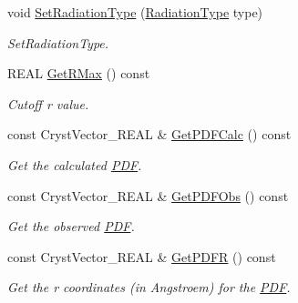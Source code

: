 \begin{DoxyCompactItemize}
\mbox{\label{class_obj_cryst_1_1_p_d_f_a51d1cebecb13d8e60038fca30547c84e}} 
void \mbox{\hyperlink{class_obj_cryst_1_1_p_d_f_a51d1cebecb13d8e60038fca30547c84e}{Set\+Radiation\+Type}} (\mbox{\hyperlink{namespace_obj_cryst_a48fe50a094c607f8897378934d3d73ef}{Radiation\+Type}} type)
\begin{DoxyCompactList}\small\item\em Set\+Radiation\+Type. \end{DoxyCompactList}\item 
\mbox{\label{class_obj_cryst_1_1_p_d_f_a5db609105099fce2d78202bae8f39295}} 
R\+E\+AL \mbox{\hyperlink{class_obj_cryst_1_1_p_d_f_a5db609105099fce2d78202bae8f39295}{Get\+R\+Max}} () const
\begin{DoxyCompactList}\small\item\em Cutoff r value. \end{DoxyCompactList}\item 
\mbox{\label{class_obj_cryst_1_1_p_d_f_a726dbb04cc16b30da30e7e71a6a19551}} 
const Cryst\+Vector\+\_\+\+R\+E\+AL \& \mbox{\hyperlink{class_obj_cryst_1_1_p_d_f_a726dbb04cc16b30da30e7e71a6a19551}{Get\+P\+D\+F\+Calc}} () const
\begin{DoxyCompactList}\small\item\em Get the calculated \mbox{\hyperlink{class_obj_cryst_1_1_p_d_f}{P\+DF}}. \end{DoxyCompactList}\item 
\mbox{\label{class_obj_cryst_1_1_p_d_f_a4681c11b987a33135c306197b230b939}} 
const Cryst\+Vector\+\_\+\+R\+E\+AL \& \mbox{\hyperlink{class_obj_cryst_1_1_p_d_f_a4681c11b987a33135c306197b230b939}{Get\+P\+D\+F\+Obs}} () const
\begin{DoxyCompactList}\small\item\em Get the observed \mbox{\hyperlink{class_obj_cryst_1_1_p_d_f}{P\+DF}}. \end{DoxyCompactList}\item 
\mbox{\label{class_obj_cryst_1_1_p_d_f_a301bd3b313cea4a495b053e0f8309dec}} 
const Cryst\+Vector\+\_\+\+R\+E\+AL \& \mbox{\hyperlink{class_obj_cryst_1_1_p_d_f_a301bd3b313cea4a495b053e0f8309dec}{Get\+P\+D\+FR}} () const
\begin{DoxyCompactList}\small\item\em Get the r coordinates (in Angstroem) for the \mbox{\hyperlink{class_obj_cryst_1_1_p_d_f}{P\+DF}}. \end{DoxyCompactList}\item 

\end{DoxyCompactItemize}
